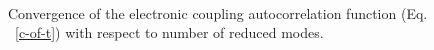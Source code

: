 \begin{figure}[t]
\\
\caption{Convergence of the electronic coupling autocorrelation function (Eq. ~\ref{c-of-t})
with respect to number of reduced modes.\label{firstmodecorr}}
\end{figure}

